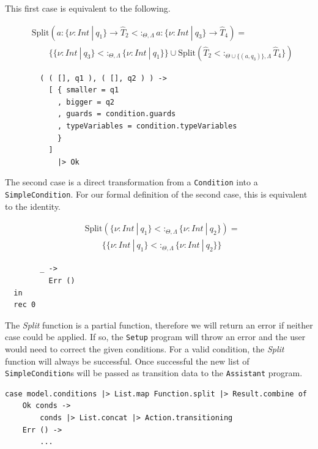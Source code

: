 \documentclass[]{scrbook}
\theoremstyle{definition}
\theoremstyle{definition}
\theoremstyle{definition}
\theoremstyle{remark}
\begin{document}
This first case is equivalent to the following.

\[
\begin{aligned}
&\text{Split}(a:\{\nu:\mathit{Int}\ |\ q_1\}\to \hat{T}_2<:_{\Theta,\Lambda}a:\{\nu:\mathit{Int}\ |\ q_3\}\to\hat{T}_4 )=\\
&\quad\quad\{\{\nu:\mathit{Int}\ |\ q_3\} <:_{\Theta,\Lambda}\{\nu:\mathit{Int}\ |\ q_1\}\}\cup\text{Split}(\hat{T}_2 <:_{\Theta\cup\{(a,q_3)\},\Lambda}\hat{T}_4\})
\end{aligned}
\]

\text{\textemdash}

\begin{verbatim}
        ( ( [], q1 ), ( [], q2 ) ) ->
          [ { smaller = q1
            , bigger = q2
            , guards = condition.guards
            , typeVariables = condition.typeVariables
            }
          ]
            |> Ok
\end{verbatim}

The second case is a direct transformation from a \texttt{Condition}
into a \texttt{SimpleCondition}. For our formal definition of the second
case, this is equivalent to the identity.

\[
\begin{aligned}
&\text{Split}(\{\nu:\mathit{Int}\ |\ q_1\}<:_{\Theta,\Lambda}\{\nu:\mathit{Int}\ |\ q_2\} )=\\
&\quad\quad\{ \{\nu:\mathit{Int}\ |\ q_1\}<:_{\Theta,\Lambda}\{\nu:\mathit{Int}\ |\ q_2\} \}
\end{aligned}
\]

\text{\textemdash}

\begin{verbatim}
        _ ->
          Err ()
  in
  rec 0
\end{verbatim}

The \emph{Split} function is a partial function, therefore we will
return an error if neither case could be applied. If so, the
\texttt{Setup} program will throw an error and the user would need to
correct the given conditions. For a valid condition, the \emph{Split}
function will always be successful. Once successful the new list of
\texttt{SimpleCondition}s will be passed as transition data to the
\texttt{Assistant} program.

\begin{verbatim}
case model.conditions |> List.map Function.split |> Result.combine of
    Ok conds ->
        conds |> List.concat |> Action.transitioning
    Err () ->
        ...
\end{verbatim}
\end{document}
